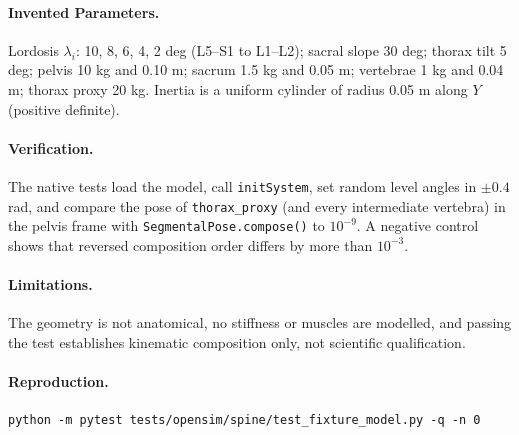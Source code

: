 \paragraph{Invented Parameters.} Lordosis $\lambda_i$: 10, 8, 6, 4, 2 deg
(L5--S1 to L1--L2); sacral slope 30 deg; thorax tilt 5 deg; pelvis 10 kg and
0.10 m; sacrum 1.5 kg and 0.05 m; vertebrae 1 kg and 0.04 m; thorax proxy 20 kg.
Inertia is a uniform cylinder of radius 0.05 m along $Y$ (positive definite).

\paragraph{Verification.} The native tests load the model, call
\texttt{initSystem}, set random level angles in $\pm 0.4$ rad, and compare the
pose of \texttt{thorax\_proxy} (and every intermediate vertebra) in the pelvis
frame with \texttt{SegmentalPose.compose()} to $10^{-9}$. A negative control
shows that reversed composition order differs by more than $10^{-3}$.

\paragraph{Limitations.} The geometry is not anatomical, no stiffness or muscles
are modelled, and passing the test establishes kinematic composition only, not
scientific qualification.

\paragraph{Reproduction.}
\begin{verbatim}
python -m pytest tests/opensim/spine/test_fixture_model.py -q -n 0
\end{verbatim}
